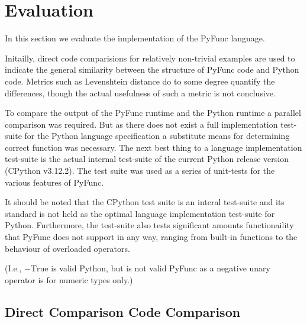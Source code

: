 \documentclass{l4proj}
\begin{document}




\chapter{Evaluation} 

In this section we evaluate the implementation of the PyFunc language.

Initailly, direct code comparisions for relatively non-trivial examples are used to indicate the general similarity between the structure of PyFunc code and Python code.
Metrics such as Levenshtein distance do to some degree quantify the differences, though the actual usefulness of such a metric is not conclusive.

To compare the output of the PyFunc runtime and the Python runtime a parallel comparison was required.
But as there does not exist a full implementation test-suite for the Python language specification a substitute means for determining correct function was necessary.
The next best thing to a language implementation test-suite is the actual internal test-suite of the current Python release version (CPython v3.12.2).
The test suite was used as a series of unit-tests for the various features of PyFunc.

It should be noted that the CPython test suite is an interal test-suite and its standard is not held as the optimal language implementation test-suite for Python.
Furthermore, the test-suite also tests significant amounts functionaility that PyFunc does not support in any way, ranging from built-in functions to the behaviour of overloaded operators.

(I.e., $-\text{True}$ is valid Python, but is not valid PyFunc as a negative unary operator is for numeric types only.)

\section{Direct Comparison Code Comparison}
\end{document}
